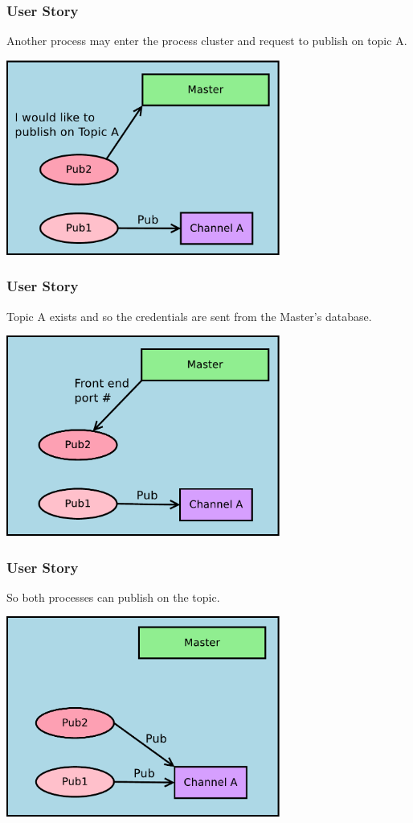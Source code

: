 \documentclass[xcolor=svgnames]{beamer}
\begin{document}
\begin{frame}[fragile]
  \frametitle{User Story}
 Another process may enter the process cluster and request to publish 
 on topic A.
\begin{center}
\includegraphics[width=9cm]{./Diagram5.pdf}
\end{center}
\end{frame}


\begin{frame}[fragile]
  \frametitle{User Story}
Topic A exists and so the credentials are sent from the Master's database.
\begin{center}
\includegraphics[width=9cm]{./Diagram6.pdf}
\end{center}
\end{frame}


\begin{frame}[fragile]
  \frametitle{User Story}
So both processes can publish on the topic.
\begin{center}
\includegraphics[width=9cm]{./Diagram7.pdf}
\end{center}
\end{frame}
\end{document}
